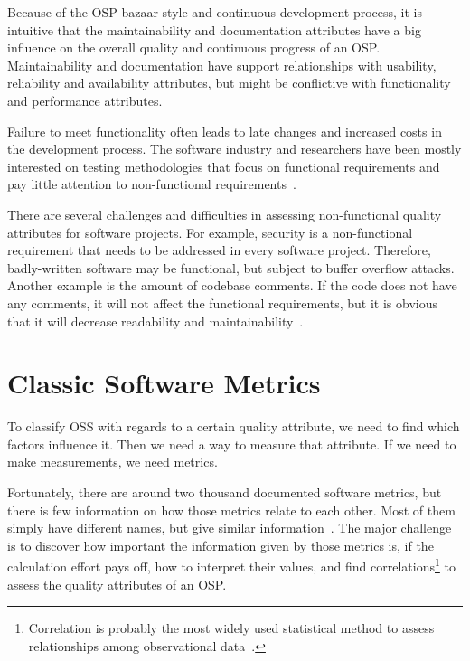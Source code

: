 Because of the OSP bazaar style and continuous development process, it is intuitive that the maintainability and documentation attributes
have a big influence on the overall quality and continuous progress of an OSP.
Maintainability and documentation have support relationships
with usability, reliability and availability attributes, but might be conflictive with functionality and performance attributes.

Failure to meet functionality often leads to late changes and increased costs in the development process.
The software industry and researchers have been mostly interested on testing methodologies
that focus on functional requirements and pay little attention to non-functional requirements~\cite{chung2009non}.

There are several challenges and difficulties in assessing non-functional quality attributes for software projects.
For example, security is a non-functional requirement that needs to be addressed in every software project.
Therefore, badly-written software may be functional, but subject to buffer overflow attacks.
Another example is the amount of codebase comments. If the code does not have any comments, it will not affect the functional requirements,
but it is obvious that it will decrease readability and maintainability~\cite{gousios2007software}.

\section{Classic Software Metrics}
To classify OSS with regards to a certain quality attribute, we need to find which factors influence it.
Then we need a way to measure that attribute. If we need to make measurements, we need metrics.

Fortunately, there are around two thousand documented software metrics, but there is few information on how those metrics relate to each other.
Most of them simply have different names, but give similar information~\cite{fenton1999software}.
The major challenge is to discover how important the information given by those metrics is, if the calculation effort pays off,
how to interpret their values, and find
\textsf{correlations}\footnote{Correlation is probably the most widely used statistical method to assess relationships among observational data~\cite{kan2002metrics}.}
 to assess the quality attributes of an OSP.


